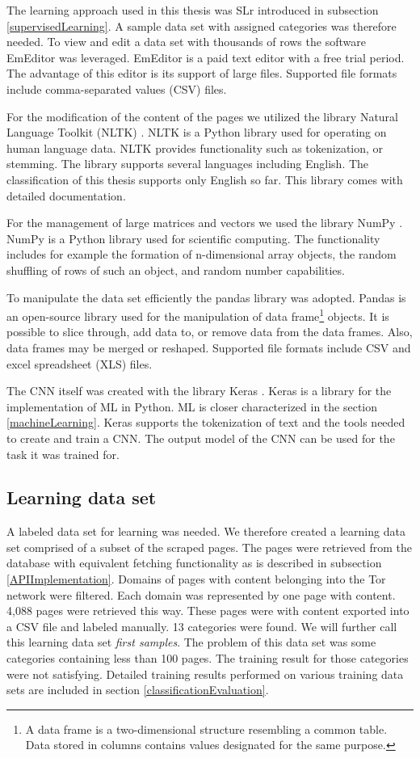 The learning approach used in this thesis was SLr introduced in subsection \ref{supervisedLearning}. A sample data set with assigned categories was therefore needed. To view and edit a data set with thousands of rows the software EmEditor \cite{emeditor} was leveraged. EmEditor is a paid text editor with a free trial period. The advantage of this editor is its support of large files. Supported file formats include comma-separated values (CSV) files. 

For the modification of the content of the pages we utilized the library Natural Language Toolkit (NLTK) \cite{nltk}. NLTK is a Python library used for operating on human language data. NLTK provides functionality such as tokenization, or stemming. The library supports several languages including English. The classification of this thesis supports only English so far. This library comes with detailed documentation.

For the management of large matrices and vectors we used the library NumPy \cite{numpy}. NumPy is a Python library used for scientific computing. The functionality includes for example the formation of n-dimensional array objects, the random shuffling of rows of such an object, and random number capabilities. 

To manipulate the data set efficiently the pandas library \cite{pandas} was adopted. Pandas is an open-source library used for the manipulation of data frame\footnote{A data frame is a two-dimensional structure resembling a common table. Data stored in columns contains values designated for the same purpose. } objects. It is possible to slice through, add data to, or remove data from the data frames. Also, data frames may be merged or reshaped. Supported file formats include CSV and excel spreadsheet (XLS) files.

The CNN itself was created with the library Keras \cite{keras}. Keras is a library for the implementation of ML in Python. ML is closer characterized in the section \ref{machineLearning}. Keras supports the tokenization of text and the tools needed to create and train a CNN. The output model of the CNN can be used for the task it was trained for.

\subsection{Learning data set} \label{LearningDatasetImplementation}
A labeled data set for learning was needed. We therefore created a learning data set comprised of a subset of the scraped pages. The pages were retrieved from the database with equivalent fetching functionality as is described in subsection \ref{APIImplementation}. Domains of pages with content belonging into the Tor network were filtered. Each domain was represented by one page with content. 4,088 pages were retrieved this way. These pages were with content exported into a CSV file and labeled manually. 13 categories were found. We will further call this learning data set \textit{first samples}. The problem of this data set was some categories containing less than 100 pages. The training result for those categories were not satisfying. Detailed training results performed on various training data sets are included in section \ref{classificationEvaluation}. 


